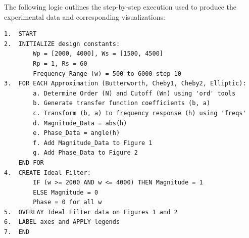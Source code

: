 The following logic outlines the step-by-step execution used to produce the experimental data and corresponding visualizations:

\begin{verbatim}
1.  START
2.  INITIALIZE design constants:
        Wp = [2000, 4000], Ws = [1500, 4500]
        Rp = 1, Rs = 60
        Frequency_Range (w) = 500 to 6000 step 10
3.  FOR EACH Approximation (Butterworth, Cheby1, Cheby2, Elliptic):
        a. Determine Order (N) and Cutoff (Wn) using 'ord' tools
        b. Generate transfer function coefficients (b, a)
        c. Transform (b, a) to frequency response (h) using 'freqs'
        d. Magnitude_Data = abs(h)
        e. Phase_Data = angle(h)
        f. Add Magnitude_Data to Figure 1
        g. Add Phase_Data to Figure 2
    END FOR
4.  CREATE Ideal Filter:
        IF (w >= 2000 AND w <= 4000) THEN Magnitude = 1
        ELSE Magnitude = 0
        Phase = 0 for all w
5.  OVERLAY Ideal Filter data on Figures 1 and 2
6.  LABEL axes and APPLY legends
7.  END
\end{verbatim}
